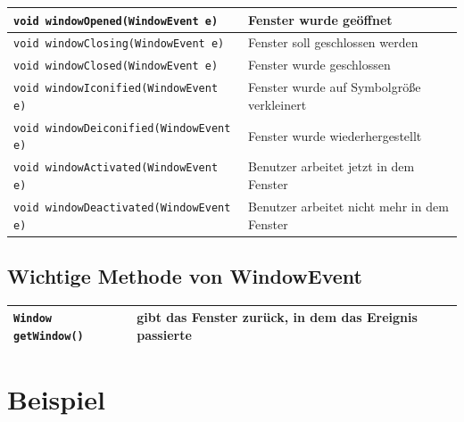 \bgroup
\def\arraystretch{1.2}
\begin{tabular}{|l|l|}\hline
\lstinline|void windowOpened(WindowEvent e)| &
Fenster wurde geöffnet
\\ \hline
\lstinline|void windowClosing(WindowEvent e)| &
Fenster soll geschlossen werden
\\ \hline
\lstinline|void windowClosed(WindowEvent e)| &
Fenster wurde geschlossen
\\ \hline
\lstinline|void windowIconified(WindowEvent e)| &
Fenster wurde auf Symbolgröße verkleinert
\\ \hline
\lstinline|void windowDeiconified(WindowEvent e)| &
Fenster wurde wiederhergestellt
\\ \hline
\lstinline|void windowActivated(WindowEvent e)| &
Benutzer arbeitet jetzt in dem Fenster
\\ \hline
\lstinline|void windowDeactivated(WindowEvent e)| &
Benutzer arbeitet nicht mehr in dem Fenster
\\ \hline
\end{tabular}
\egroup

\subsection{Wichtige Methode von WindowEvent}

\bgroup
\def\arraystretch{1.2}
\begin{tabular}{|l|l|}\hline
\lstinline|Window getWindow()| &
gibt das Fenster zurück, in dem das Ereignis passierte
\\ \hline
\end{tabular}
\egroup


\section{Beispiel}

